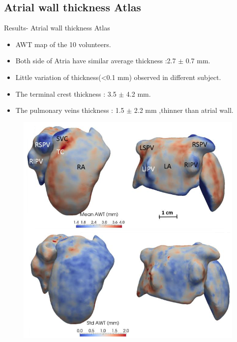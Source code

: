 \documentclass[aspectratio=43]{beamer}
\begin{document}
\newpage
\subsection{Atrial wall thickness Atlas}
\begin{frame}{Results- Atrial wall thickness Atlas}
\begin{minipage}{0.6\textwidth}\raggedleft
\begin{itemize}
        \item AWT map of the 10 volunteers.
          \item Both side of Atria have similar average thickness :2.7 \begin{math}\pm \end{math} 0.7 mm.
                \item Little variation of thickness(<0.1 mm) observed in different subject.
        \item The terminal crest thickness : 3.5 \begin{math}\pm \end{math} 4.2 mm.
        \item The pulmonary veins thickness : 1.5 \begin{math}\pm \end{math} 2.2 mm ,thinner than atrial wall.
        
\end{itemize}
\end{minipage}
\begin{minipage}{0.4\textwidth}\raggedleft
\begin{figure}[h!]


\includegraphics[width=\linewidth]{img/img7}


\end{figure}
\end{minipage}
\end{frame}
\end{document}
